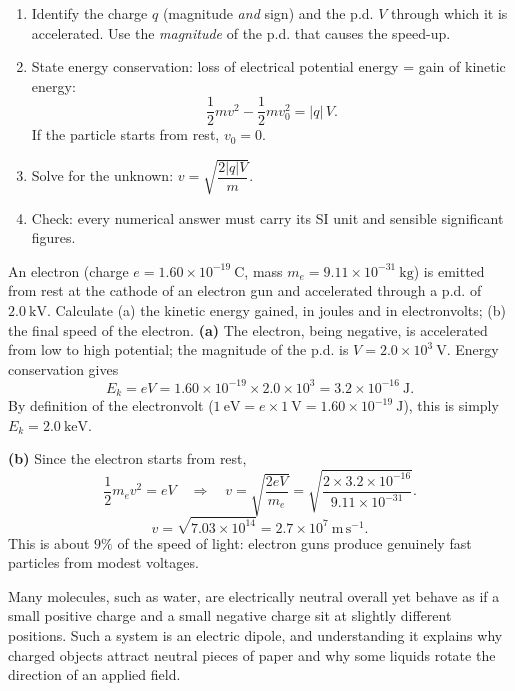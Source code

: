 \documentclass[11pt]{article}
\newcommand{\cle}[1]{{\popxbold\color{popdark}#1}}
\newcounter{popsec}
\newcounter{popsub}
\newcommand{\courssub}[1]{%
  \stepcounter{popsub}%
  \par\vspace{9pt}\noindent{\popxbold\fontsize{11.5}{13}\selectfont\color{popink}{\color{poporange}\thepopsec.\thepopsub}\hspace{6pt}#1}\par\nopagebreak\vspace{4pt}
}
\begin{document}
\begin{methode}[Solving acceleration-of-charge problems with $\tfrac{1}{2}mv^2 = qV$]
\begin{enumerate}
\item Identify the charge $q$ (magnitude \emph{and} sign) and the p.d. $V$ through which it is accelerated. Use the \emph{magnitude} of the p.d. that causes the speed-up.
\item State energy conservation: loss of electrical potential energy = gain of kinetic energy:
\[
\frac{1}{2}mv^2 - \frac{1}{2}mv_0^2 = |q|\,V.
\]
If the particle starts from rest, $v_0 = 0$.
\item Solve for the unknown: $v = \sqrt{\dfrac{2|q|V}{m}}$.
\item Check: every numerical answer must carry its SI unit and sensible significant figures.
\end{enumerate}
\end{methode}

\begin{exoresolu}
An electron (charge $e = 1.60\times 10^{-19}\ \mathrm{C}$, mass $m_e = 9.11\times 10^{-31}\ \mathrm{kg}$) is emitted from rest at the cathode of an electron gun and accelerated through a p.d. of $2.0\ \mathrm{kV}$. Calculate (a) the kinetic energy gained, in joules and in electronvolts; (b) the final speed of the electron.
\tcblower
\textbf{(a)} The electron, being negative, is accelerated from low to high potential; the magnitude of the p.d. is $V = 2.0\times 10^{3}\ \mathrm{V}$. Energy conservation gives
\[
E_k = eV = 1.60\times 10^{-19} \times 2.0\times 10^{3} = 3.2\times 10^{-16}\ \mathrm{J}.
\]
By definition of the \cle{electronvolt} ($1\ \mathrm{eV} = e \times 1\ \mathrm{V} = 1.60\times 10^{-19}\ \mathrm{J}$), this is simply $E_k = 2.0\ \mathrm{keV}$.

\textbf{(b)} Since the electron starts from rest,
\[
\frac{1}{2}m_e v^2 = eV
\quad\Longrightarrow\quad
v = \sqrt{\frac{2eV}{m_e}} = \sqrt{\frac{2\times 3.2\times 10^{-16}}{9.11\times 10^{-31}}}.
\]
\[
v = \sqrt{7.03\times 10^{14}} = 2.7\times 10^{7}\ \mathrm{m\,s^{-1}}.
\]
This is about $9\%$ of the speed of light: electron guns produce genuinely fast particles from modest voltages.
\end{exoresolu}

\courssub{The electric dipole}

Many molecules, such as water, are electrically neutral overall yet behave as if a small positive charge and a small negative charge sit at slightly different positions. Such a system is an \cle{electric dipole}, and understanding it explains why charged objects attract neutral pieces of paper and why some liquids rotate the direction of an applied field.
\end{document}
